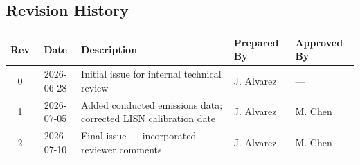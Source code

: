 \documentclass[11pt,a4paper]{article}
\begin{document}
\vspace{3mm}
\noindent{\color{rulegray}\rule{\linewidth}{0.6pt}}
\vspace{2mm}

\noindent{\small\textcolor{accent2}{This report shall not be reproduced except in full, without the written approval of Meridian Compliance Testing Laboratory. Results relate only to the item(s) tested and were obtained under the conditions stated herein.}}

\vspace{4mm}

\subsection*{\textcolor{accent2}{Revision History}}
\vspace{-2mm}
\begin{table}[H]
\centering
\footnotesize
\begin{tabularx}{\linewidth}{@{} c c Y l l @{}}
\toprule
\textbf{Rev} & \textbf{Date} & \textbf{Description} & \textbf{Prepared By} & \textbf{Approved By} \\
 & 2026-06-28 & Initial issue for internal technical review & J. Alvarez & --- \\
1 & 2026-07-05 & Added conducted emissions data; corrected LISN calibration date & J. Alvarez & M. Chen \\
2 & 2026-07-10 & Final issue --- incorporated reviewer comments & J. Alvarez & M. Chen \\
\bottomrule
\end{tabularx}
\end{table}

\vspace{2mm}












\end{document}
